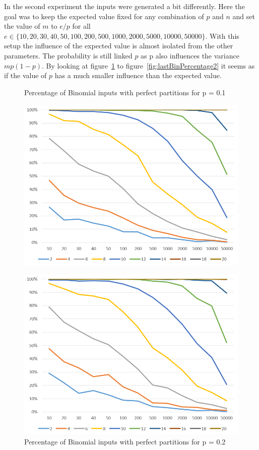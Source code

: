 In the second experiment the inputs were generated a bit differently. Here the goal was to keep the expected value fixed for any combination of $p$ and $n$ and set the value of $m$ to $e/p$ for all $e \in \{10, 20, 30, 40, 50, 100, 200, 500, 1000, 2000, 5000, 10000, 50000\}$. With this setup the influence of the expected value is almost isolated from the other parameters. The probability is still linked $p$ as p also influences the variance $mp(1-p)$. By looking at figure~\ref{fig:firstBinPercentage2} to figure~\ref{fig:lastBinPercentage2} it seems as if the value of $p$ has a much smaller influence than the expected value.

\begin{figure}[h]
      \centering
      \begin{minipage}[b]{0.45\textwidth}
            \caption{Percentage of Binomial inputs with perfect partitions for p = 0.1}
            \includegraphics[width=\textwidth]{figures/images/solvabilityOfInputs/solvability0_1.png}\label{fig:firstBinPercentage2}
      \end{minipage}
      \hspace{0.75cm}
      \begin{minipage}[b]{0.45\textwidth}
            \caption{Percentage of Binomial inputs with perfect partitions for p = 0.2}
            \includegraphics[width=\textwidth]{figures/images/solvabilityOfInputs/solvability0_2.png}

\end{minipage}
\end{figure}
